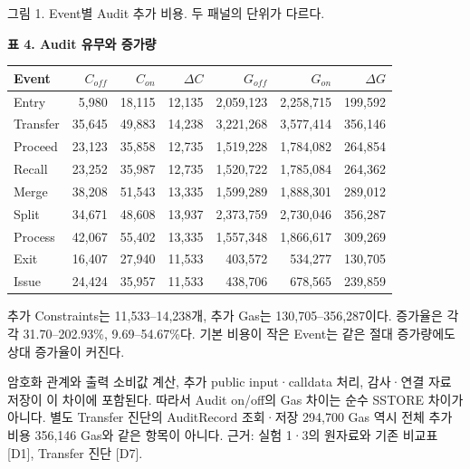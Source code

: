 {\small 그림 1. Event별 Audit 추가 비용. 두 패널의 단위가 다르다.}\par
\begin{center}\small\setlength{\tabcolsep}{6pt}
    \textbf{표 4. Audit 유무와 증가량}\par\smallskip
    \begin{tabular}{@{}lrrrrrr@{}}\toprule
        \textbf{Event} & \textbf{$C_{off}$} & \textbf{$C_{on}$} & \textbf{$\Delta C$} & \textbf{$G_{off}$} & \textbf{$G_{on}$} & \textbf{$\Delta G$} \\ \midrule
        Entry          & 5,980              & 18,115            & 12,135              & 2,059,123          & 2,258,715         & 199,592             \\
        Transfer       & 35,645             & 49,883            & 14,238              & 3,221,268          & 3,577,414         & 356,146             \\
        Proceed        & 23,123             & 35,858            & 12,735              & 1,519,228          & 1,784,082         & 264,854             \\
        Recall         & 23,252             & 35,987            & 12,735              & 1,520,722          & 1,785,084         & 264,362             \\
        Merge          & 38,208             & 51,543            & 13,335              & 1,599,289          & 1,888,301         & 289,012             \\
        Split          & 34,671             & 48,608            & 13,937              & 2,373,759          & 2,730,046         & 356,287             \\
        Process        & 42,067             & 55,402            & 13,335              & 1,557,348          & 1,866,617         & 309,269             \\
        Exit           & 16,407             & 27,940            & 11,533              & 403,572            & 534,277           & 130,705             \\
        Issue          & 24,424             & 35,957            & 11,533              & 438,706            & 678,565           & 239,859             \\
        \bottomrule\end{tabular}\end{center}

추가 Constraints는 11,533--14,238개, 추가 Gas는 130,705--356,287이다.
증가율은 각각 31.70--202.93\%, 9.69--54.67\%다.
기본 비용이 작은 Event는 같은 절대 증가량에도 상대 증가율이 커진다.

암호화 관계와 출력 소비값 계산, 추가 public input·calldata 처리, 감사·연결 자료 저장이 이 차이에 포함된다.
따라서 Audit on/off의 Gas 차이는 순수 SSTORE 차이가 아니다.
별도 Transfer 진단의 AuditRecord 조회·저장 294,700 Gas 역시 전체 추가 비용 356,146 Gas와 같은 항목이 아니다.
    {\small 근거: 실험 1·3의 원자료와 기존 비교표 [D1], Transfer 진단 [D7].}\par
